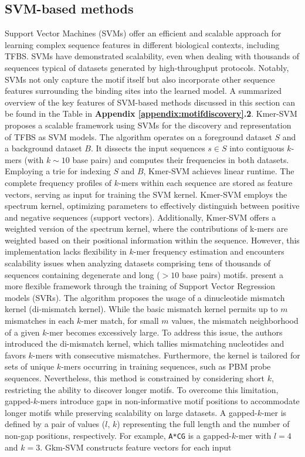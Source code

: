 \documentclass[a4paper, titlepage, openright]{book}
\begin{document}
\subsection{SVM-based methods}
Support Vector Machines (SVMs) offer an efficient and scalable approach for learning complex sequence features in different biological contexts, including TFBS. SVMs have demonstrated scalability, even when dealing with thousands of sequences typical of datasets generated by high-throughput protocols. Notably, SVMs not only capture the motif itself but also incorporate other sequence features surrounding the binding sites into the learned model. A summarized overview of the key features of SVM-based methods discussed in this section can be found in the Table in \textbf{Appendix \ref{appendix:motifdiscovery}.2}. Kmer-SVM \citep{lee2011discriminative,fletez2013kmer} proposes a scalable framework using SVMs for the discovery and representation of TFBS as SVM models. The algorithm operates on a foreground dataset $S$ and a background dataset $B$. It dissects the input sequences $s \in S$ into contiguous $k$-mers (with $k \sim 10$ base pairs) and computes their frequencies in both datasets. Employing a trie \citep{bodon2003trie} for indexing $S$ and $B$, Kmer-SVM achieves linear runtime. The complete frequency profiles of $k$-mers within each sequence are stored as feature vectors, serving as input for training the SVM kernel. Kmer-SVM employs the spectrum kernel, optimizing parameters to effectively distinguish between positive and negative sequences (support vectors). Additionally, Kmer-SVM offers a weighted version of the spectrum kernel, where the contributions of k-mers are weighted based on their positional information within the sequence. However, this implementation lacks flexibility in $k$-mer frequency estimation and encounters scalability issues when analyzing datasets comprising tens of thousands of sequences containing degenerate and long ($>10$ base pairs) motifs. \cite{agius2010high} present a more flexible framework through the training of Support Vector Regression models (SVRs). The algorithm proposes the usage of a dinucleotide mismatch kernel (di-mismatch kernel). While the basic mismatch kernel permits up to $m$ mismatches in each $k$-mer match, for small $m$ values, the mismatch neighborhood of a given $k$-mer becomes excessively large. To address this issue, the authors introduced the di-mismatch kernel, which tallies mismatching nucleotides and favors $k$-mers with consecutive mismatches. Furthermore, the kernel is tailored for sets of unique $k$-mers occurring in training sequences, such as PBM probe sequences. Nevertheless, this method is constrained by considering short $k$, restricting the ability to discover longer motifs. To overcome this limitation, gapped-$k$-mers \citep{ghandi2014robust} introduce gaps in non-informative motif positions to accommodate longer motifs while preserving scalability on large datasets. A gapped-$k$-mer is defined by a pair of values ($l$, $k$) representing the full length and the number of non-gap positions, respectively. For example, \texttt{A*CG} is a gapped-$k$-mer with $l=4$ and $k=3$. Gkm-SVM \citep{ghandi2014enhanced,ghandi2016gkmsvm} constructs feature vectors for each input 
\end{document}
